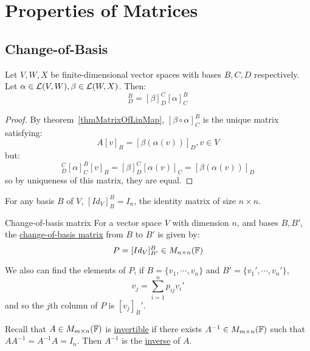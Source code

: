 \documentclass[../Main.tex]{subfiles}
\begin{document}
\section{Properties of Matrices}
\subsection{Change-of-Basis}
\begin{proposition}
    Let $V, W, X$ be finite-dimensional vector spaces with bases $B, C, D$ respectively. Let $\alpha \in \mathcal{L}(V,W), \beta \in \mathcal{L}(W, X)$. Then:
    \begin{equation*}
        [\beta \circ\alpha]_D^B =[\beta]_D^C [\alpha]_C^B
    \end{equation*}
    \label{propMatrixCompose}
\end{proposition}
\begin{proof}
    By theorem~\ref{thmMatrixOfLinMap}, $[\beta\circ\alpha]_C^B$ is the unique matrix satisfying:
    \begin{equation*}
        A[v]_B = [\beta(\alpha(v))]_D, v \in V
    \end{equation*}
    but:
    \begin{equation*}
        [\beta]_D^C[\alpha]_C^B[v]_B = [\beta]_D^C[\alpha(v)]_C = [\beta(\alpha(v))]_D
    \end{equation*}
    so by uniqueness of this matrix, they are equal.
\end{proof}
\begin{remark}
    For any basis $B$ of $V$, $[Id_V]_B^B = I_n$, the identity matrix of size $n\times n$.
\end{remark}
\begin{definition}{Change-of-basis matrix}
    For a vector space $V$ with dimension $n$, and bases $B, B'$, the \underline{change-of-basis matrix} from $B$ to $B'$ is given by:
    \begin{equation*}
        P = [Id_V]_{B'}^B \in M_{n \times n}(\mathbb{F})
    \end{equation*}
\end{definition}
We also can find the elements of $P$, if $B = \{v_1, \cdots, v_n\}$ and $B' = \{v_1', \cdots, v_n'\}$,
\begin{equation*}
    v_j = \sum_{i=1}^{n}p_{ij} v_i'
\end{equation*}
and so the $j$th column of $P$ is $[v_j]_B'$.

Recall that $A \in M_{m \times n}(\mathbb{F})$ is \underline{invertible} if there exists $A^{-1} \in M_{m \times n}(\mathbb{F})$ such that $A A^{-1} = A^{-1} A = I_n$. Then $A^{-1}$ is the \underline{inverse} of $A$.
\end{document}
